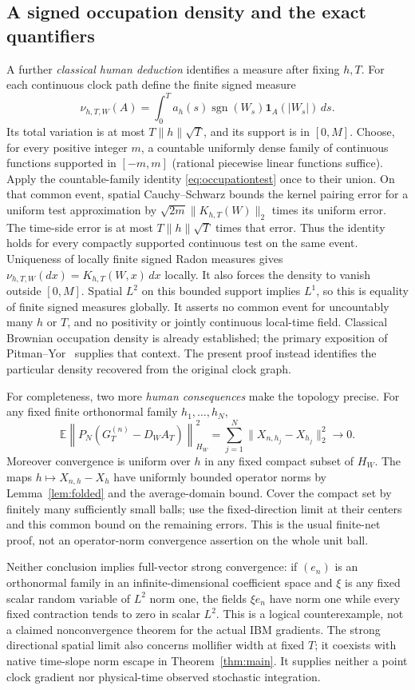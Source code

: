 \documentclass[11pt]{article}
\begin{document}
\subsection*{A signed occupation density and the exact quantifiers}
A further \emph{classical human deduction} identifies a measure after
fixing $h,T$. For each continuous clock path define the finite signed
measure
\[
 \nu_{h,T,W}(A)=\int_0^T a_h(s)\operatorname{sgn}(W_s)
                                      \mathbf1_A(|W_s|)\,ds.
\]
Its total variation is at most $T\|h\|\sqrt T$, and its support is in
$[0,M]$. Choose, for every positive integer $m$, a countable uniformly
dense family of continuous functions supported in $[-m,m]$ (rational
piecewise linear functions suffice). Apply the countable-family identity
\eqref{eq:occupationtest} once to their union. On that common event,
spatial Cauchy--Schwarz bounds the kernel pairing error for a uniform
test approximation by $\sqrt{2m}\|K_{h,T}(W)\|_2$ times its uniform
error. The time-side error is at most $T\|h\|\sqrt T$ times that error.
Thus the identity holds for every compactly supported continuous test
on the same event. Uniqueness of locally finite signed Radon measures
gives $\nu_{h,T,W}(dx)=K_{h,T}(W,x)\,dx$ locally. It also forces the
density to vanish outside $[0,M]$. Spatial $L^2$ on this bounded support
implies $L^1$, so this is equality of finite signed measures globally.
It asserts no common event for uncountably many $h$ or $T$, and no
positivity or jointly continuous local-time field. Classical Brownian
occupation density is already established; the primary exposition
of Pitman--Yor~\cite{PY} supplies that context. The present proof instead
identifies the particular density recovered from the original clock graph.

For completeness, two more \emph{human consequences} make the topology
precise. For any fixed finite orthonormal family $h_1,\ldots,h_N$,
\[
 \mathbb E\left\|P_N(G_T^{(n)}-D_WA_T)\right\|_{H_W}^2
 =\sum_{j=1}^N\|X_{n,h_j}-X_{h_j}\|_2^2\longrightarrow0.
\]
Moreover convergence is uniform over $h$ in any fixed compact subset
of $H_W$. The maps $h\mapsto X_{n,h}-X_h$ have uniformly bounded
operator norms by Lemma~\ref{lem:folded} and the average-domain bound.
Cover the compact set by finitely many sufficiently small balls; use
the fixed-direction limit at their centers and this common bound on
the remaining errors. This is the usual finite-net proof, not an
operator-norm convergence assertion on the whole unit ball.

Neither conclusion implies full-vector strong convergence: if $(e_n)$
is an orthonormal family in an infinite-dimensional coefficient space
and $\xi$ is any fixed scalar random variable of $L^2$ norm one, the
fields $\xi e_n$ have norm one while every fixed contraction tends to
zero in scalar $L^2$. This is a logical counterexample, not a claimed
nonconvergence theorem for the actual IBM gradients. The strong
directional spatial limit also concerns mollifier width at fixed $T$;
it coexists with native time-slope norm escape in Theorem~\ref{thm:main}.
It supplies neither a point clock gradient nor physical-time observed
stochastic integration.
\end{document}
